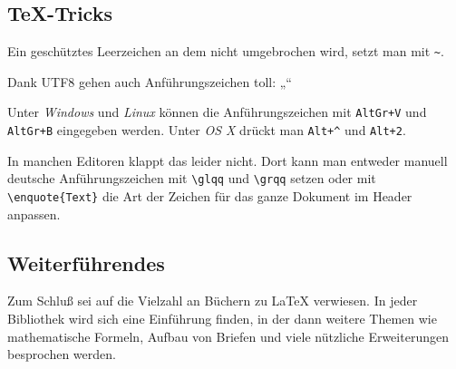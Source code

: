 \subsection{TeX-Tricks}

Ein geschütztes Leerzeichen an dem nicht umgebrochen wird, setzt man mit \verb!~!.

Dank UTF8 gehen auch Anführungszeichen toll: „“

Unter \emph{Windows} und \emph{Linux} können die Anführungszeichen mit \texttt{AltGr+V} und \texttt{AltGr+B} eingegeben werden. Unter \emph{OS X} drückt man \texttt{Alt+\^{}} und \texttt{Alt+2}.

In manchen Editoren klappt das leider nicht. Dort kann man entweder manuell deutsche Anführungszeichen mit \verb!\glqq! und \verb!\grqq! setzen oder mit \verb!\enquote{Text}! die Art der Zeichen für das ganze Dokument im Header anpassen.


\subsection{Weiterführendes}

Zum Schluß sei auf die Vielzahl an Büchern zu \LaTeX{} verwiesen. In jeder Bibliothek wird sich eine Einführung finden, in der dann weitere Themen wie mathematische Formeln, Aufbau von Briefen und viele nützliche Erweiterungen besprochen werden.

